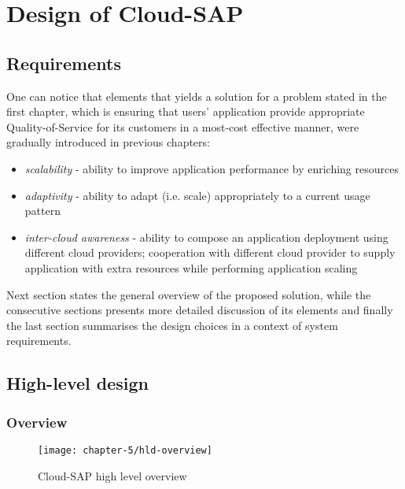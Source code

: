 \chapter{Design of Cloud-SAP}


\section{Requirements}
One can notice that elements that yields a solution for a problem stated in the first chapter, which is ensuring that users' application provide appropriate Quality-of-Service for its customers in a most-cost effective manner, were gradually introduced in previous chapters:

\begin{itemize}
	\item \emph{scalability} - ability to improve application performance by enriching resources
	\item \emph{adaptivity} - ability to adapt (i.e. scale) appropriately to a current usage pattern
	\item \emph{inter-cloud awareness} - ability to compose an application deployment using different cloud providers; cooperation with different cloud provider to supply application with extra resources while performing application scaling
\end{itemize}

Next section states the general overview of the proposed solution, while the consecutive sections presents more detailed discussion of its elements and finally the last section summarises the design choices in a context of system requirements.
	
\section{High-level design}
\subsection{Overview}

\begin{figure}[!ht]
  \begin{center}
    \texttt{[image: chapter-5/hld-overview]}
  \end{center}
  \caption{Cloud-SAP high level overview}
  \label{design:hld-overview}
\end{figure}

